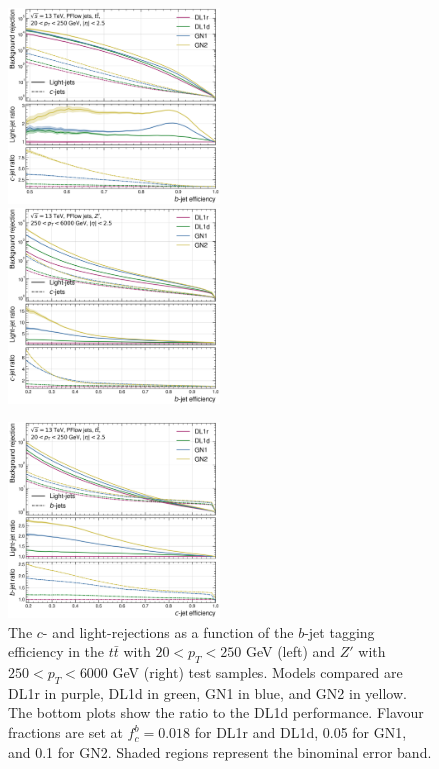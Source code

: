 \begin{center}
  \begin{figure}[h!]
  \centerline{
  \includegraphics[width=0.50\textwidth]{Images/FTAG/GN/GN2/rocs/roc_ttbar.png}
  \includegraphics[width=0.50\textwidth]{Images/FTAG/GN/GN2/rocs/roc_zp.png}
  }
  \caption{The $c$- and light-rejections as a function of the $b$-jet tagging efficiency in the $t\bar{t}$ with $20 < p_T < 250$ GeV (left) and $Z'$ with $250 < p_T < 6000$ GeV (right) test samples. Models compared are DL1r in purple, DL1d in green, GN1 in blue, and GN2 in yellow. The bottom plots show the ratio to the DL1d performance. Flavour fractions are set at $f^b_c = 0.018$ for DL1r and DL1d, 0.05 for GN1, and 0.1 for GN2. Shaded regions represent the binominal error band.}
  \label{fig:GN2rocb}
  \bigskip
  \centerline{
  \includegraphics[width=0.50\textwidth]{Images/FTAG/GN/GN2/rocs/roc_ttbar_c.png}
}
\end{figure}
\end{center}
